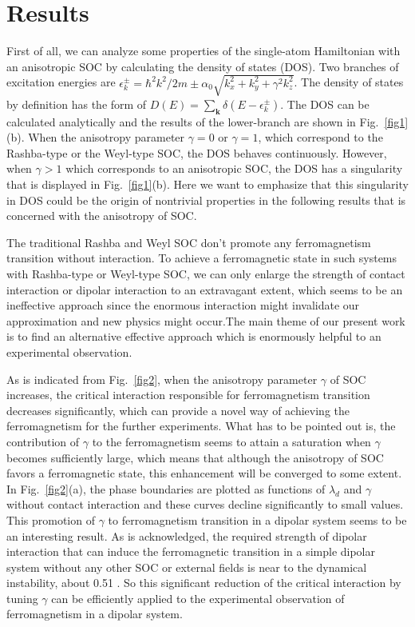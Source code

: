 \documentclass[twocolumn,english,pra,superscriptaddress]{revtex4-1}
\begin{document}
\section{Results}
First of all, we can analyze some properties of the single-atom Hamiltonian with an anisotropic SOC by calculating the density of states (DOS). Two branches of excitation energies are $\epsilon_{k}^{\pm}=\hbar^{2}k^{2}/2m\pm\alpha_{0}\sqrt{k_{x}^{2}+k_{y}^{2}+\gamma^{2}k_{z}^{2}}$. The density of states by definition has the form of $D(E)=\sum_{\mathbf{k}}\delta(E-\epsilon_{k}^{\pm})$. The DOS can be calculated analytically and the results of the lower-branch are shown in Fig.~\ref{fig1}(b). When the anisotropy parameter $\gamma=0$ or $\gamma=1$, which correspond to the Rashba-type or the Weyl-type SOC, the DOS behaves continuously. However, when $\gamma>1$ which corresponds to an anisotropic SOC, the DOS has a singularity that is displayed in Fig.~\ref{fig1}(b). Here we want to emphasize that this singularity in DOS could be the origin of nontrivial properties in the following results that is concerned with the anisotropy of SOC.\par
The traditional Rashba and Weyl SOC don't promote any ferromagnetism transition without interaction. To achieve a ferromagnetic state in such systems with Rashba-type or Weyl-type SOC, we can only enlarge the strength of contact interaction or dipolar interaction to an extravagant extent, which seems to be an ineffective approach since the enormous interaction might invalidate our approximation and new physics might occur.The main theme of our present work is to find an alternative effective approach which is enormously helpful to an experimental observation. \par
As is indicated from Fig.~\ref{fig2}, when the anisotropy parameter $\gamma$ of SOC increases, the critical interaction responsible for ferromagnetism transition decreases significantly, which can provide a novel way of achieving the ferromagnetism for the further experiments. What has to be pointed out is, the contribution of $\gamma$ to the ferromagnetism seems to attain a saturation when $\gamma$ becomes sufficiently large, which means that although the anisotropy of SOC favors a ferromagnetic state, this enhancement will be converged to some extent. In Fig.~\ref{fig2}(a), the phase boundaries are plotted as functions of $\lambda_{d}$ and $\gamma$ without contact interaction and these curves decline significantly to small values. This promotion of $\gamma$ to ferromagnetism transition in a dipolar system seems to be an interesting result. As is acknowledged, the required strength of dipolar interaction that can induce the ferromagnetic transition in a simple dipolar system without any other SOC or external fields is near to the dynamical instability, about 0.51 \cite{PhysRevLett.103.205301}. So this significant reduction of the critical interaction by tuning $\gamma$ can be efficiently applied to the experimental observation of ferromagnetism in a dipolar system.\par
\end{document}
